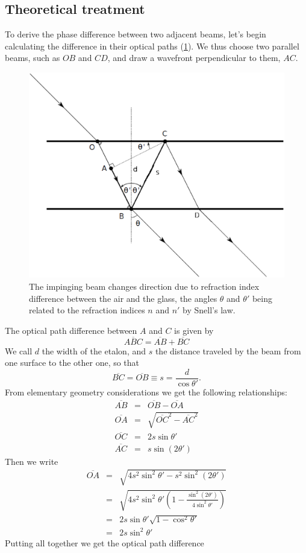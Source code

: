 \subsection{Theoretical treatment}
To derive the phase difference between two adjacent beams, let's begin calculating the difference in their optical paths (\cref{fig:angoli}). We thus choose two parallel beams, such as $OB$ and $CD$, and draw a wavefront perpendicular to them, $AC$. 
\begin{figure}[!h]
\centering
\includegraphics[width=.8\linewidth]{eps/angoli.eps}
\caption{The impinging beam changes direction due to refraction index difference between the air and the glass, the angles $\theta$ and $\theta'$ being related to the refraction indices $n$ and $n'$ by Snell's law.}
\label{fig:angoli}
\end{figure}
The optical path difference between $A$ and $C$ is given by
\begin{equation}
\overline{ABC}=\overline{AB}+\overline{BC}
\end{equation}
 We call $d$ the width of the etalon, and $s$ the distance traveled by the beam from one surface to the other one, so that
\begin{equation}
\overline{BC}=\overline{OB}\equiv s=\frac{d}{\cos\theta'}.
\end{equation} 
From elementary geometry considerations we get the following relationships:
\begin{eqnarray}
\overline{AB}&=&\overline{OB}-\overline{OA}\\
\overline{OA}&=&\sqrt{\overline{OC}^2-\overline{AC}^2}\\
\overline{OC}&=&2s\sin\theta'\\
\overline{AC}&=&s\sin(2\theta')
\end{eqnarray}
Then we write
\begin{eqnarray}
\nonumber\overline{OA}&=&\sqrt{4s^2\sin^2\theta'-s^2\sin^2(2\theta')}\\
\nonumber&=&\sqrt{4s^2\sin^2\theta'\left(1-\frac{\sin^2(2\theta')}{4\sin^2\theta'}\right)}\\
\nonumber&=&2s\sin\theta'\sqrt{1-\cos^2\theta'}\\
&=&2s\sin^2\theta'
\end{eqnarray}
Putting all together we get the optical path difference

